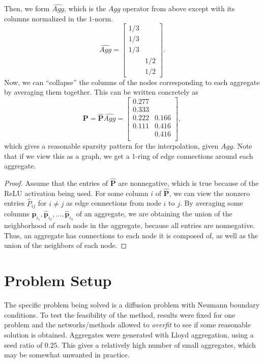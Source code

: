 \documentclass{article}
\newcommand{\mat}[1]{\bm{{#1}}}
\renewcommand{\vec}[1]{\bm{{#1}}}
\newcommand{\sfrac}[2]{#1/#2}
\begin{document}
Then, we form $\hat{Agg}$, which is the $Agg$ operator from above except with its columns normalized in the $1$-norm.
\begin{equation}
\hat{Agg} =
\begin{bmatrix}
  \sfrac{1}{3} & \\
  \sfrac{1}{3} & \\
  \sfrac{1}{3} & \\
  & \sfrac{1}{2} \\
  & \sfrac{1}{2}
\end{bmatrix}.
\end{equation}
Now, we can ``collapse'' the columns of the nodes corresponding to each aggregate by averaging them together.  This can be written concretely as
\begin{equation}
\mat{P} = \mat{\hat{P}}\hat{Agg} = \begin{bmatrix}
  0.277 & \\
  0.333 & \\
  0.222 & 0.166 \\
  0.111 & 0.416 \\
  & 0.416 \\
\end{bmatrix},
\end{equation}
which gives a reasonable sparsity pattern for the interpolation, given $Agg$.  Note that if we view this as a graph, we get a 1-ring of edge connections around each aggregate.
\begin{proof}
  Assume that the entries of $\mat{\hat{P}}$ are nonnegative, which is true because of the ReLU activation being used.  For some column $i$ of $\mat{\hat{P}}$, we can view the nonzero entries $\hat{P}_{ij}$ for $i \neq j$ as edge connections from node $i$ to $j$.  By averaging some columns $\vec{\hat{p}}_{i_1}, \vec{\hat{p}}_{i_2}, \ldots, \vec{\hat{p}}_{i_n}$ of an aggregate, we are obtaining the union of the neighborhood of each node in the aggregate, because all entries are nonnegative.  Thus, an aggregate has connections to each node it is composed of, as well as the union of the neighbors of each node.
\end{proof}

\section{Problem Setup}
The specific problem being solved is a diffusion problem with Neumann boundary conditions.  To test the feasibility of the method, results were fixed for one problem and the networks/methods allowed to \textit{overfit} to see if some reasonable solution is obtained.  Aggregates were generated with Lloyd aggregation, using a seed ratio of $0.25$.  This gives a relatively high number of small aggregates, which may be somewhat unwanted in practice.
\end{document}
